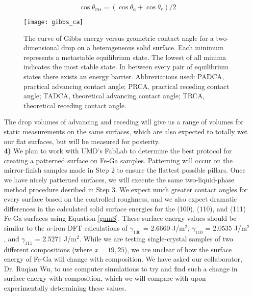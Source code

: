 \begin{equation}
	\label{avg_cah}	
	\cos\theta_{ms} = (\cos\theta_{a} + \cos\theta_{r})/2 
\end{equation}
\begin{wrapfigure}[16]{r}{0.45\linewidth}
	\centering
	\texttt{[image: gibbs\_ca]}
	\caption{The curve of Gibbs energy versus geometric contact angle for a two-dimensional drop on a heterogeneous solid surface. Each minimum represents a metastable equilibrium state. The lowest of all minima indicates the most stable state. In between every pair of equilibrium states there exists an energy barrier. Abbreviations used: PADCA, practical advancing contact angle; PRCA, practical receding contact angle; TADCA, theoretical advancing contact angle; TRCA, theoretical receding contact angle.\cite{Marmur2009b}}
	\label{fig:gibbs_ca}
\end{wrapfigure}
The drop volumes of advancing and receding \ca[s] will give us a range of volumes for static \ca measurements on the same surfaces, which are also expected to totally wet our flat surfaces, but will be measured for posterity.\\
\textbf{4)} We plan to work with UMD's FabLab to determine the best protocol for creating a patterned surface on Fe-Ga samples. Patterning will occur on the mirror-finish samples made in Step 2 to ensure the flattest possible pillars. Once we have nicely patterned surfaces, we will execute the same two-liquid-phase method procedure desribed in Step 3. We expect much greater contact angles for every surface based on the controlled roughness, and we also expect dramatic differences in the calculated solid surface energies for the \hkl(100), \hkl(110), and \hkl(111) Fe-Ga surfaces using Equation \ref{gamS}. These surface energy values should be similar to the $\alpha$-iron DFT calculations of $\gamma_{100}$ = 2.6660 J/m$^2$, $\gamma_{110}$ = 2.0535 J/m$^2$, and $\gamma_{111}$ = 2.5271 J/m$^2$.\cite{Wang2000} While we are testing single-crystal samples of two different compositions (\fegacomp where $x=19,25$), we are unclear of how the surface energy of Fe-Ga will change with composition. We have asked our collaborator, Dr. Ruqian Wu, to use computer simulations to try and find such a change in surface energy with composition, which we will compare with upon experimentally determining these values. 



